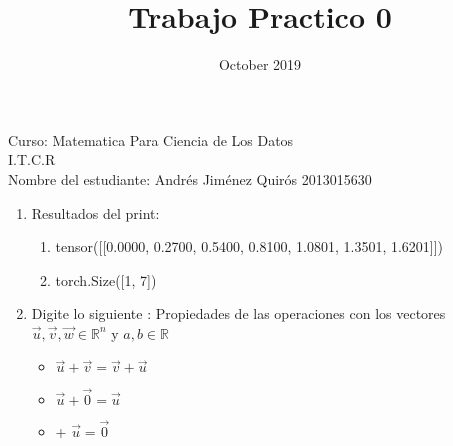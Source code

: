 \documentclass{article}
\title{Trabajo Practico 0}
\date{October 2019}
\begin{document}
\maketitle
\noindent Curso: Matematica Para Ciencia de Los Datos\\
I.T.C.R\\
Nombre del estudiante: Andrés Jiménez Quirós 2013015630 
\\

\hline

\begin{enumerate}
	\item Resultados del print: 
    \begin{enumerate}
    	\item tensor([[0.0000, 0.2700, 0.5400, 0.8100, 1.0801, 1.3501, 1.6201]])
        \item torch.Size([1, 7])
    \end{enumerate}
   
    \item Digite lo siguiente : Propiedades de las operaciones con los vectores $\vec{u}, \vec{v}, \vec{w} \in \mathbb{R}^n$ y $a,b \in \mathbb{R}$
        \begin{itemize}
        	\item  $\vec{u} + \vec{v} = \vec{v} + \vec{u}$
        	\item $\vec{u} + \vec{0} = \vec{u}$
        	\item  {} + $\vec{u} = \vec{0}$
    	\end{itemize}
\end{enumerate}
\end{document}
